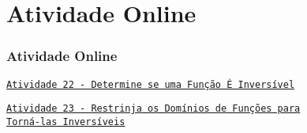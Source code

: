 \section{Atividade Online}
\begin{frame}
\frametitle{Atividade Online} 

\href{https://pt.khanacademy.org/math/algebra2/manipulating-functions/invertible-functions/e/inverse-domain-range}
{{\tt Atividade 22 - Determine se uma Função É Inversível}}

\href{https://pt.khanacademy.org/math/algebra2/manipulating-functions/invertible-functions/e/restrict-the-domains-of-functions}
{{\tt Atividade 23 - Restrinja os Domínios de Funções para\\ Torná-las
Inversíveis}}


\end{frame}
